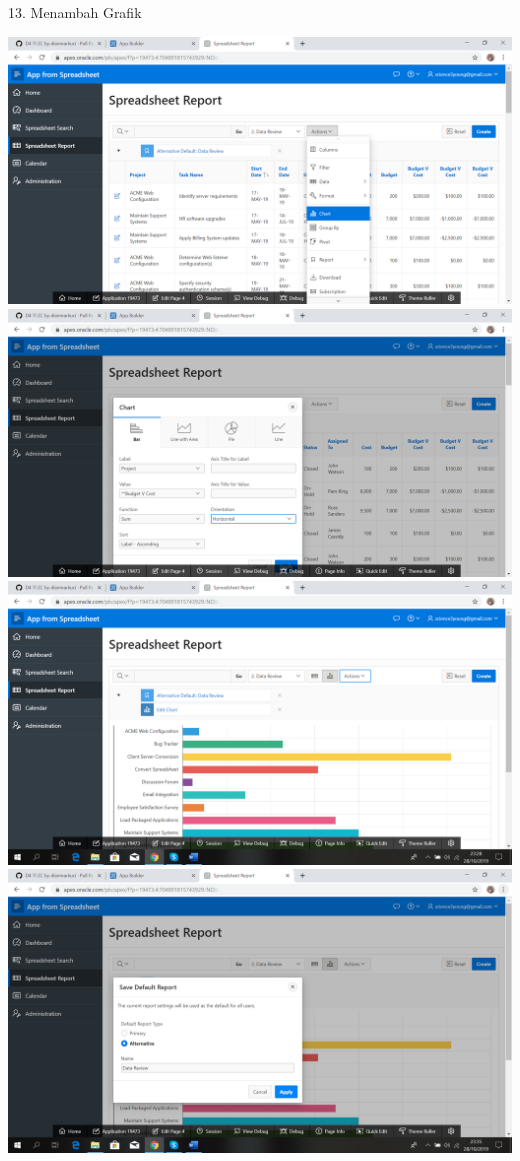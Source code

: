 \documentclass{article}
\begin{document}
\item 13. Menambah Grafik
\begin{center}
    \includegraphics[width=10cm\textwidth]{figure/23.png}
    \includegraphics[width=10cm\textwidth]{figure/24.png}
    \includegraphics[width=10cm\textwidth]{figure/25.png}
    \includegraphics[width=10cm\textwidth]{figure/26.png}
\end{center}
\end{document}
